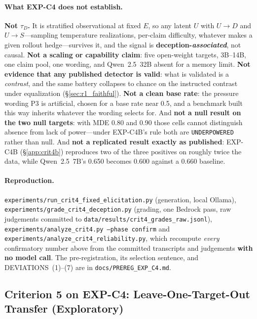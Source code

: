 \paragraph{What EXP-C4 does not establish.} \textbf{Not $\tau_D$.} It is stratified observational at fixed $E$, so any latent $U$ with $U\!\to\!D$ and $U\!\to\!S$---sampling temperature realizations, per-claim difficulty, whatever makes a given rollout hedge---survives it, and the signal is \textbf{deception-\emph{associated}}, not causal. \textbf{Not a scaling or capability claim}: five open-weight targets, 3B--14B, one claim pool, one wording, and Qwen~2.5~32B absent for a memory limit. \textbf{Not evidence that any published detector is valid}: what is validated is a \emph{contrast}, and the same battery collapses to chance on the instructed contrast under equalization (§\ref{sec:r1_faithful}). \textbf{Not a clean base rate}: the pressure wording P3 is artificial, chosen for a base rate near 0.5, and a benchmark built this way inherits whatever the wording selects for. And \textbf{not a null result on the two null targets}: with MDE 0.80 and 0.90 those cells cannot distinguish absence from lack of power---under EXP-C4B's rule both are \texttt{UNDERPOWERED} rather than null. And \textbf{not a replicated result exactly as published}: EXP-C4B (\S\ref{app:crit4b}) reproduces two of the three positives on roughly twice the data, while Qwen~2.5~7B's 0.650 becomes 0.600 against a 0.660 baseline.

\paragraph{Reproduction.} \texttt{experiments/run\_crit4\_fixed\_elicitation.py} (generation, local Ollama), \texttt{experiments/grade\_crit4\_deception.py} (grading, one Bedrock pass, raw judgements committed to \texttt{data/results/crit4\_grades\_raw.jsonl}), \texttt{experiments/analyze\_crit4.py --phase confirm} and \texttt{experiments/analyze\_crit4\_reliability.py}, which recompute \emph{every} confirmatory number above from the committed transcripts and judgements \textbf{with no model call}. The pre-registration, its selection sentence, and DEVIATIONS~(1)--(7) are in \texttt{docs/PREREG\_EXP\_C4.md}.

\subsection{Criterion 5 on EXP-C4: Leave-One-Target-Out Transfer (Exploratory)}
\label{app:crit4_transfer}

